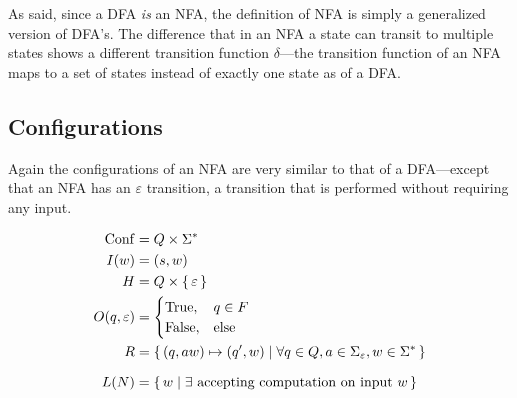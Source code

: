 As said, since a DFA \emph{is} an NFA, the definition of NFA is simply a generalized
version of DFA's. The difference that in an NFA a state can transit to multiple states
shows a different transition function $\delta$---the transition function of an NFA maps to
a set of states instead of exactly one state as of a DFA.

\subsection{Configurations}

Again the configurations of an NFA are very similar to that of a DFA---except that an NFA
has an $\varepsilon$ transition, a transition that is performed without requiring any
input.

\begin{definition}
    \begin{align*}
        { \mathrm{Conf} } &= Q \times \Sigma^*
        \\
        I(w)  &= (s, w)
        \\
        H     &= Q \times { \left\{\,\varepsilon\,\right\} }
        \\
        O(q,\varepsilon) &=
                            \begin{cases}
                                { \text{\upshape True} },  & q \in F  \\
                                { \text{\upshape False} }, & \text{else}
                            \end{cases}
        \\
        R &= { \left\{\,
            (q,aw) \mapsto (q',w) \mid
            \forall q \in Q, a \in \Sigma_\varepsilon, w \in \Sigma^*
        \,\right\} }
    \end{align*}
\end{definition}

\begin{definition}
    \[
        L(N) = { \left\{\, w \mid \exists \text{ accepting computation on input $w$} \,\right\} }
    \]
\end{definition}

